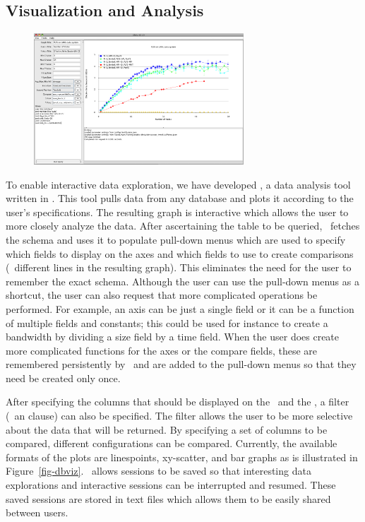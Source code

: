 \subsection{\label{sec-analysis}Visualization and Analysis}

\begin{figure}[tb]
\centering
\includegraphics[width=0.7\textwidth]{dbvizGraphsAndConfigs/screenShot.png}
\end{figure}

To enable interactive data exploration, we have developed \dbviz, a data
analysis tool written in .  This tool pulls data from any
 database and plots it according to the user's specifications.  The
resulting graph is interactive which allows the user to more closely analyze
the data.  After ascertaining the table to be queried, \dbviz\ fetches the
schema and uses it to populate pull-down menus which are used to specify which
fields to display on the axes and which fields to use to create comparisons
(\ie\ different lines in the resulting graph).  This eliminates the need for
the user to remember the exact schema.  Although the user can use the pull-down
menus as a shortcut, the user can also request that more complicated operations
be performed.  For example, an axis can be just a single field or it can be a
function of multiple fields and constants; this could be used for instance to
create a bandwidth by dividing a size field by a time field.  When the user
does create more complicated functions for the axes or the compare fields,
these are remembered persistently by \dbviz\ and are added to the pull-down
menus so that they need be created only once.



After specifying the columns that should be displayed on the \xaxis\ and the
\yaxis, a filter (\eg\ an   clause) can also be
specified.  The filter allows the user to be more selective about the data that
will be returned.  By specifying a set of columns to be compared, different
configurations can be compared.  Currently, the available formats of the plots
are linespoints, xy-scatter, and bar graphs as is illustrated in
Figure~\ref{fig-dbviz}.  \dbviz\ allows sessions to be saved so that 
interesting data explorations and interactive sessions can be interrupted
and resumed.  These saved sessions are stored in text files which allows them
to be easily shared between users. 

